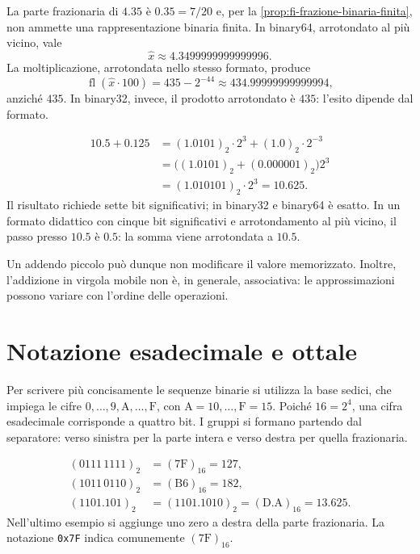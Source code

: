 \begin{example}
\label{ex:fi-arrotondamento-prodotto}
La parte frazionaria di \(4.35\) è \(0.35=7/20\) e, per la
\cref{prop:fi-frazione-binaria-finita}, non ammette una
rappresentazione binaria finita.
In binary64, arrotondato al più vicino, vale
\[
  \widehat{x}\approx4.3499999999999996.
\]
La moltiplicazione, arrotondata nello stesso formato, produce
\[
  \operatorname{fl}(\widehat{x}\cdot100)
  =435-2^{-44}\approx434.99999999999994,
\]
anziché \(435\). In binary32, invece, il prodotto arrotondato
è \(435\): l'esito dipende dal formato.
\end{example}

\begin{example}
\begin{align*}
  10.5+0.125
    &=(1.0101)_2\cdot2^3+(1.0)_2\cdot2^{-3}\\
    &=\bigl((1.0101)_2+(0.000001)_2\bigr)2^3\\
    &=(1.010101)_2\cdot2^3=10.625.
\end{align*}
Il risultato richiede sette bit significativi; in binary32 e binary64
è esatto. In un formato didattico con cinque bit significativi e
arrotondamento al più vicino, il passo presso \(10.5\) è \(0.5\):
la somma viene arrotondata a \(10.5\).
\end{example}

Un addendo piccolo può dunque non modificare il valore memorizzato.
Inoltre, l'addizione in virgola mobile non è, in generale, associativa:
le approssimazioni possono variare con l'ordine delle operazioni.

\section{Notazione esadecimale e ottale}
\label{sec:fi-esadecimale-ottale}

Per scrivere più concisamente le sequenze binarie si utilizza la
base sedici, che impiega le cifre
\(0,\ldots,9,\mathrm{A},\ldots,\mathrm{F}\),
con \(\mathrm{A}=10,\ldots,\mathrm{F}=15\). Poiché \(16=2^4\),
una cifra esadecimale corrisponde a quattro bit. I gruppi si formano
partendo dal separatore: verso sinistra per la parte intera e verso
destra per quella frazionaria.

\begin{example}
\begin{align*}
  (0111\,1111)_2&=(\mathrm{7F})_{16}=127,\\
  (1011\,0110)_2&=(\mathrm{B6})_{16}=182,\\
  (1101.101)_2&=(1101.1010)_2=(\mathrm{D.A})_{16}=13.625.
\end{align*}
Nell'ultimo esempio si aggiunge uno zero a destra della parte
frazionaria. La notazione \texttt{0x7F} indica comunemente
\((\mathrm{7F})_{16}\).
\end{example}

